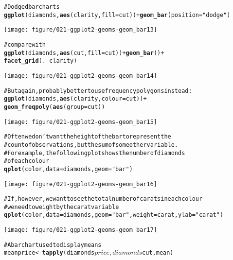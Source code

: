 \documentclass[a4paper,titlepage]{tufte-handout}\usepackage{graphicx, color}
\makeatletter
\def\maxwidth{ %
  \ifdim\Gin@nat@width>\linewidth
    \linewidth
  \else
    \Gin@nat@width
  \fi
}
\newcommand{\hlfunctioncall}[1]{\textcolor[rgb]{0.501960784313725,0,0.329411764705882}{\textbf{#1}}}%
\newcommand{\hlstring}[1]{\textcolor[rgb]{0.6,0.6,1}{#1}}%
\newcommand{\hlcomment}[1]{\textcolor[rgb]{0.180392156862745,0.6,0.341176470588235}{#1}}%
\newenvironment{kframe}{%
 \def\at@end@of@kframe{}%
 \ifinner\ifhmode%
  \def\at@end@of@kframe{\end{minipage}}%
  \begin{minipage}{\columnwidth}%
 \fi\fi%
 \def\FrameCommand##1{\hskip\@totalleftmargin \hskip-\fboxsep
 \colorbox{shadecolor}{##1}\hskip-\fboxsep
     \hskip-\linewidth \hskip-\@totalleftmargin \hskip\columnwidth}%
 \MakeFramed {\advance\hsize-\width
   \@totalleftmargin\z@ \linewidth\hsize
   \@setminipage}}%
 {\par\unskip\endMakeFramed%
 \at@end@of@kframe}
\newenvironment{knitrout}{}{} %
\makeatother
\begin{document}
\begin{knitrout}
\begin{kframe}
\begin{alltt}
\hlcomment{# Dodged bar charts}
\hlfunctioncall{ggplot}(diamonds, \hlfunctioncall{aes}(clarity, fill=cut)) + \hlfunctioncall{geom_bar}(position=\hlstring{"dodge"})
\end{alltt}
\end{kframe}\texttt{[image: figure/021-ggplot2-geoms-geom\_bar13]} \begin{kframe}\begin{alltt}
\hlcomment{# compare with}
\hlfunctioncall{ggplot}(diamonds, \hlfunctioncall{aes}(cut, fill=cut)) + \hlfunctioncall{geom_bar}() +
  \hlfunctioncall{facet_grid}(. ~ clarity)
\end{alltt}
\end{kframe}\texttt{[image: figure/021-ggplot2-geoms-geom\_bar14]} \begin{kframe}\begin{alltt}
\hlcomment{# But again, probably better to use frequency polygons instead:}
\hlfunctioncall{ggplot}(diamonds, \hlfunctioncall{aes}(clarity, colour=cut)) +
  \hlfunctioncall{geom_freqpoly}(\hlfunctioncall{aes}(group = cut))
\end{alltt}
\end{kframe}\texttt{[image: figure/021-ggplot2-geoms-geom\_bar15]} \begin{kframe}\begin{alltt}
\hlcomment{# Often we don't want the height of the bar to represent the}
\hlcomment{# count of observations, but the sum of some other variable.}
\hlcomment{# For example, the following plot shows the number of diamonds}
\hlcomment{# of each colour}
\hlfunctioncall{qplot}(color, data=diamonds, geom=\hlstring{"bar"})
\end{alltt}
\end{kframe}\texttt{[image: figure/021-ggplot2-geoms-geom\_bar16]} \begin{kframe}\begin{alltt}
\hlcomment{# If, however, we want to see the total number of carats in each colour}
\hlcomment{# we need to weight by the carat variable}
\hlfunctioncall{qplot}(color, data=diamonds, geom=\hlstring{"bar"}, weight=carat, ylab=\hlstring{"carat"})
\end{alltt}
\end{kframe}\texttt{[image: figure/021-ggplot2-geoms-geom\_bar17]} \begin{kframe}\begin{alltt}
\hlcomment{# A bar chart used to display means}
meanprice <- \hlfunctioncall{tapply}(diamonds$price, diamonds$cut, mean)

\end{alltt}
\end{kframe}
\end{knitrout}
\end{document}
